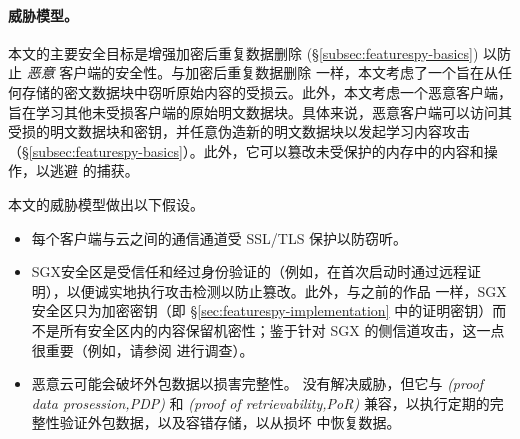 \paragraph*{威胁模型。} 本文的主要安全目标是增强加密后重复数据删除 (\S\ref{subsec:featurespy-basics}) 以防止 {\em 恶意} 客户端的安全性。与加密后重复数据删除 \cite{bellare2013MLE} 一样，本文考虑了一个旨在从任何存储的密文数据块中窃听原始内容的受损云。此外，本文考虑一个恶意客户端，旨在学习其他未受损客户端的原始明文数据块。具体来说，恶意客户端可以访问其受损的明文数据块和密钥，并任意伪造新的明文数据块以发起学习内容攻击（\S\ref{subsec:featurespy-basics}）。此外，它可以篡改未受保护的内存中的内容和操作，以逃避 \sysnameF 的捕获。

本文的威胁模型做出以下假设。
\begin{itemize}[leftmargin=*]
    \item
          每个客户端与云之间的通信通道受 SSL/TLS 保护以防窃听。
    \item
          SGX安全区是受信任和经过身份验证的（例如，在首次启动时通过远程证明），以便诚实地执行攻击检测以防止篡改。此外，与之前的作品 \cite{shinde20, ren21} 一样，SGX安全区只为加密密钥（即 \S\ref{sec:featurespy-implementation} 中的证明密钥）而不是所有安全区内的内容保留机密性；鉴于针对 SGX 的侧信道攻击，这一点很重要（例如，请参阅 \cite{fei21} 进行调查）。
    \item
          恶意云可能会破坏外包数据以损害完整性。 \sysnameF 没有解决威胁，但它与 \textit{  (proof data prosession,PDP)} \cite{ateniese2007provable} 和 \textit{  (proof of retrievability,PoR)} \cite{juels2007pors} 兼容，以执行定期的完整性验证外包数据，以及容错存储，以从损坏 \cite{li15} 中恢复数据。
\end{itemize}